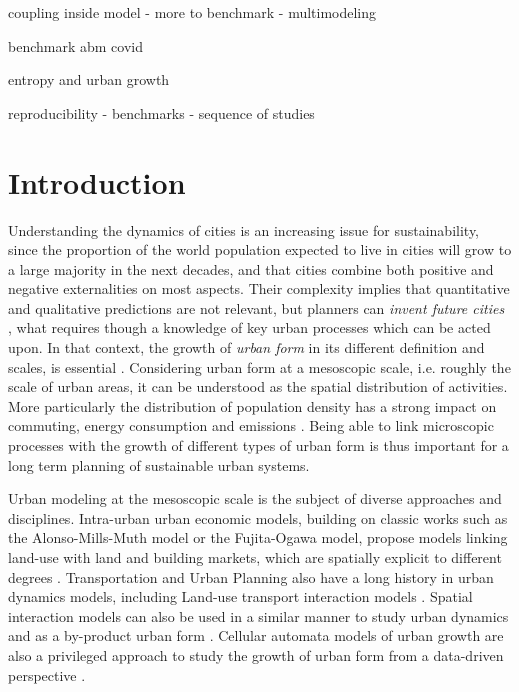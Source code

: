 \documentclass[10pt,letterpaper]{article}
\begin{document}
\cite{strano2021agglomeration}

\cite{rybski2021comparing}

\cite{Rybski2021Modeling} coupling inside model - more to benchmark - multimodeling

\cite{bithellsystematic} benchmark abm covid

\cite{jun2020modling} entropy and urban growth


\cite{Nicholse2100769118} reproducibility - benchmarks - sequence of studies


\section*{Introduction}


Understanding the dynamics of cities is an increasing issue for sustainability, since the proportion of the world population expected to live in cities will grow to a large majority in the next decades, and that cities combine both positive and negative externalities on most aspects. Their complexity implies that quantitative and qualitative predictions are not relevant, but planners can \emph{invent future cities} \cite{batty2018inventing}, what requires though a knowledge of key urban processes which can be acted upon. In that context, the growth of \emph{urban form} in its different definition and scales, is essential \cite{williams2000achieving}. Considering urban form at a mesoscopic scale, i.e. roughly the scale of urban areas, it can be understood as the spatial distribution of activities. More particularly the distribution of population density has a strong impact on commuting, energy consumption and emissions \cite{le2012urban}. Being able to link microscopic processes with the growth of different types of urban form is thus important for a long term planning of sustainable urban systems.


Urban modeling at the mesoscopic scale is the subject of diverse approaches and disciplines. Intra-urban urban economic models, building on classic works such as the Alonso-Mills-Muth model or the Fujita-Ogawa model, propose models linking land-use with land and building markets, which are spatially explicit to different degrees \cite{viguie2012trade}. Transportation and Urban Planning also have a long history in urban dynamics models, including Land-use transport interaction models \cite{wegener2004land}. Spatial interaction models can also be used in a similar manner to study urban dynamics and as a by-product urban form \cite{milton2019accelerating}. Cellular automata models of urban growth are also a privileged approach to study the growth of urban form from a data-driven perspective \cite{batty1997cellular}.
\end{document}
